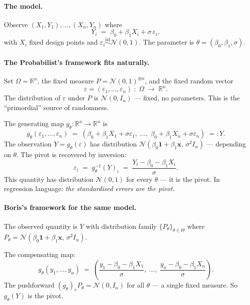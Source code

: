 \documentclass[a4paper,oneside,12pt]{extarticle}
\theoremstyle{plain}
\theoremstyle{definition}
\theoremstyle{remark}
\begin{document}
\paragraph{The model.}
Observe $(X_1, Y_1), \ldots, (X_n, Y_n)$ where
\[
  Y_i \;=\; \beta_0 + \beta_1 X_i + \sigma\,\varepsilon_i,
\]
with $X_i$ fixed design points and $\varepsilon_i \stackrel{\mathrm{iid}}{\sim}
\mathcal{N}(0,1)$.  The parameter is $\theta = (\beta_0, \beta_1, \sigma)$.

\paragraph{The Probabilist's framework fits naturally.}
Set $\Omega = \mathbb{R}^n$, the fixed measure $P =
\mathcal{N}(0,1)^{\otimes n}$, and the fixed random vector
\[
  \varepsilon = (\varepsilon_1, \ldots, \varepsilon_n)
  \;:\; \Omega \;\longrightarrow\; \mathbb{R}^n.
\]
The distribution of $\varepsilon$ under $P$ is $\mathcal{N}(0,
I_n)$ — fixed, no parameters.  This is the ``primordial'' source
of randomness.

The generating map $g_\theta : \mathbb{R}^n \to \mathbb{R}^n$ is
\[
  g_\theta(\varepsilon_1, \ldots, \varepsilon_n)
  \;=\;
  (\beta_0 + \beta_1 X_1 + \sigma\varepsilon_1,\;\ldots,\;
   \beta_0 + \beta_1 X_n + \sigma\varepsilon_n)
  \;=: Y.
\]
The observation $Y = g_\theta(\varepsilon)$ has distribution
$\mathcal{N}(\beta_0 \mathbf{1} + \beta_1 \mathbf{x},\, \sigma^2 I_n)$
— depending on $\theta$.  The pivot is recovered by inversion:
\[
  \varepsilon_i
  \;=\;
  g_\theta^{-1}(Y)_i
  \;=\;
  \frac{Y_i - \beta_0 - \beta_1 X_i}{\sigma}.
\]
This quantity has distribution $\mathcal{N}(0,1)$ for every $\theta$
— it is the pivot.  In regression language: \emph{the standardised
errors are the pivot.}

\paragraph{Boris's framework for the same model.}
The observed quantity is $Y$ with distribution family
$\{P_\theta\}_{\theta \in \Theta}$ where
$P_\theta = \mathcal{N}(\beta_0 \mathbf{1} + \beta_1\mathbf{x},\,
\sigma^2 I_n)$.

The compensating map:
\[
  g_\theta(y_1, \ldots, y_n)
  \;=\;
  \left(\frac{y_1 - \beta_0 - \beta_1 X_1}{\sigma},\;\ldots,\;
  \frac{y_n - \beta_0 - \beta_1 X_n}{\sigma}\right).
\]
The pushforward $(g_\theta)_* P_\theta = \mathcal{N}(0, I_n)$ for
all $\theta$ — a single fixed measure.  So $g_\theta(Y)$ is the
pivot.
\end{document}
